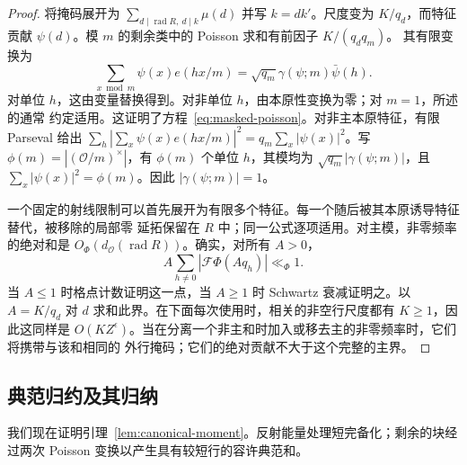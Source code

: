 \documentclass[11pt,a4paper]{article}
\numberwithin{equation}{section}
\numberwithin{figure}{section}
\theoremstyle{definition}
\theoremstyle{remark}
\begin{document}
\begin{proof}
将掩码展开为 \(\sum_{d\mid\operatorname{rad}R,\ d\mid k}\mu(d)\) 并写 \(k=dk'\)。尺度变为
\(K/q_d\)，而特征贡献 \(\psi(d)\)。模 \(m\) 的剩余类中的 Poisson 求和有前因子 \(K/(q_dq_m)\)。
其有限变换为
\[
 \sum_{x\bmod m}\psi(x)e(hx/m)
   =\sqrt{q_m}\gamma(\psi;m)\bar\psi(h).
\]
对单位 \(h\)，这由变量替换得到。对非单位 \(h\)，由本原性变换为零；对 \(m=1\)，所述的通常
约定适用。这证明了方程~\eqref{eq:masked-poisson}。对非主本原特征，有限 Parseval 给出
\(\sum_h|\sum_x\psi(x)e(hx/m)|^2=q_m\sum_x|\psi(x)|^2\)。写
\(\phi(m)=|(\mathcal O/m)^\times|\)，有 \(\phi(m)\) 个单位 \(h\)，其模均为
\(\sqrt{q_m}|\gamma(\psi;m)|\)，且 \(\sum_x|\psi(x)|^2=\phi(m)\)。因此 \(|\gamma(\psi;m)|=1\)。

一个固定的射线限制可以首先展开为有限多个特征。每一个随后被其本原诱导特征替代，被移除的局部零
延拓保留在 \(R\) 中；同一公式逐项适用。对主模，非零频率的绝对和是
\(O_\Phi(d_{\mathcal O}(\operatorname{rad}R))\)。确实，对所有 \(A>0\)，
\[
 A\sum_{h\ne0}|\mathcal F\Phi(Aq_h)|\ll_\Phi1.
\]
当 \(A\le1\) 时格点计数证明这一点，当 \(A\ge1\) 时 Schwartz 衰减证明之。以 \(A=K/q_d\) 对
\(d\) 求和此界。在下面每次使用时，相关的非空行尺度都有 \(K\ge1\)，因此这同样是
\(O(KZ^\epsilon)\)。当在分离一个非主和时加入或移去主的非零频率时，它们将携带与该和相同的
外行掩码；它们的绝对贡献不大于这个完整的主界。
\end{proof}

\subsection{典范归约及其归纳}

我们现在证明引理~\ref{lem:canonical-moment}。反射能量处理短完备化；剩余的块经过两次 Poisson
变换以产生具有较短行的容许典范和。
\end{document}
